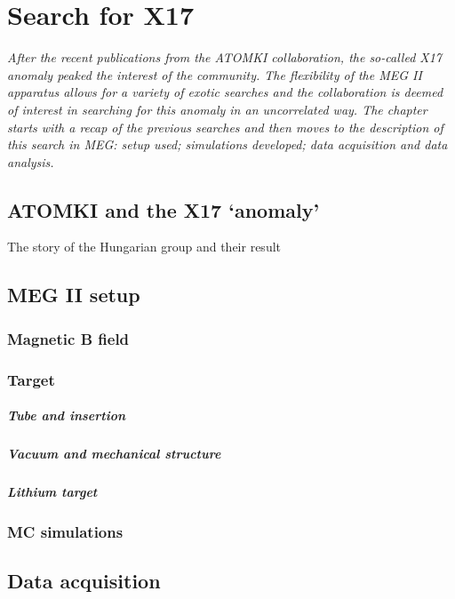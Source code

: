 \chapter{Search for X17}
\begin{refsection}
\label{ch:X17}
{\itshape After the recent publications from the ATOMKI collaboration, the so-called X17 anomaly peaked the interest of the community. The flexibility of the MEG II apparatus allows for a variety of exotic searches and the collaboration is deemed of interest in searching for this anomaly in an uncorrelated way.
The chapter starts with a recap of the previous searches and then moves to the description of this search in MEG: setup used; simulations developed; data acquisition and data analysis.}

\section{ATOMKI and the X17 `anomaly'}
    The story of the Hungarian group and their result
\section{MEG II setup}
    \subsection{Magnetic \textbf{B} field}
    \subsection{Target}
        \paragraph{Tube and insertion}
        \paragraph{Vacuum and mechanical structure}
        \paragraph{Lithium target}
    \subsection{MC simulations}
\section{Data acquisition}

\end{refsection}

